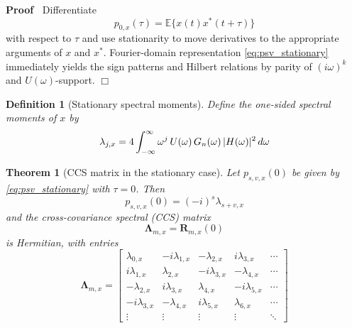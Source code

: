 \documentclass{article}
\newcommand{\tmmathbf}[1]{\ensuremath{\boldsymbol{#1}}}
\newenvironment{proof}{\noindent\textbf{Proof\ }}{\hspace*{\fill}$\Box$\medskip}
\newtheorem{definition}{Definition}
\newtheorem{theorem}{Theorem}
\begin{document}
\begin{proof}
  Differentiate
  \begin{equation}
    p_{0, x} (\tau) =\mathbb{E} \{x (t) x^{\ast} (t + \tau)\}
  \end{equation}
  with respect to $\tau$ and use stationarity to move derivatives to the
  appropriate arguments of $x$ and $x^{\ast}$. Fourier-domain representation
  \eqref{eq:psv_stationary} immediately yields the sign patterns and Hilbert
  relations by parity of $(i \omega)^k$ and $U (\omega)$-support.
\end{proof}

\begin{definition}
  [Stationary spectral moments] Define the one-sided spectral moments of $x$
  by
  \begin{equation}
    \label{eq:lambda_stationary} \lambda_{j, x} = 4 \int_{- \infty}^{\infty}
    \omega^j  \hspace{0.17em} U (\omega)  \hspace{0.17em} G_n (\omega)
    \hspace{0.17em} |H (\omega) |^2  \hspace{0.17em} d \omega
  \end{equation}
\end{definition}

\begin{theorem}
  [CCS matrix in the stationary case]\label{thm:ccs_stationary} Let $p_{s, v,
  x} (0)$ be given by \eqref{eq:psv_stationary} with $\tau = 0$. Then
  \begin{equation}
    p_{s, v, x} (0) = (- i)^s \lambda_{s + v, x}
  \end{equation}
  and the cross-covariance spectral (CCS) matrix
  \begin{equation}
    \tmmathbf{\Lambda}_{m, x} =\tmmathbf{R}_{m, x} (0)
  \end{equation}
  is Hermitian, with entries
  \begin{equation}
    \tmmathbf{\Lambda}_{m, x} = \left[ \begin{array}{ccccc}
      \lambda_{0, x} & - i \lambda_{1, x} & - \lambda_{2, x} & i \lambda_{3,
      x} & \cdots\\
      i \lambda_{1, x} & \lambda_{2, x} & - i \lambda_{3, x} & - \lambda_{4,
      x} & \cdots\\
      - \lambda_{2, x} & i \lambda_{3, x} & \lambda_{4, x} & - i \lambda_{5,
      x} & \cdots\\
      - i \lambda_{3, x} & - \lambda_{4, x} & i \lambda_{5, x} & \lambda_{6,
      x} & \cdots\\
      \vdots & \vdots & \vdots & \vdots & \ddots
    \end{array} \right]
  \end{equation}
\end{theorem}
\end{document}

